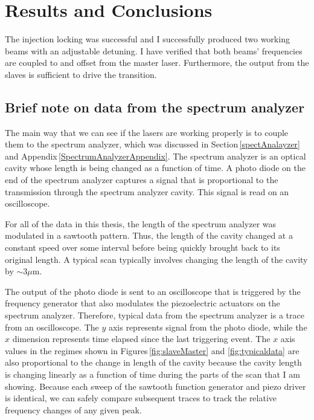 \chapter{Results and Conclusions}\label{triumphantDataChapter}

The injection locking was successful and I successfully produced two working beams with an adjustable detuning. I have verified that both beams' frequencies are coupled to and offset from the master laser. Furthermore, the output from the slaves is sufficient to drive the transition. 

\section{Brief note on data from the spectrum analyzer}

The main way that we can see if the lasers are working properly is to couple them to the spectrum analyzer, which was discussed in Section\,\ref{spectAnalayzer} and Appendix\,\ref{SpectrumAnalyzerAppendix}. The spectrum analyzer is an optical cavity whose length is being changed as a function of time. A photo diode on the end of the spectrum analyzer captures a signal that is proportional to the transmission through the spectrum analyzer cavity. This signal is read on an oscilloscope.

For all of the data in this thesis, the length of the spectrum analyzer was modulated in a sawtooth pattern. Thus, the length of the cavity changed at a constant speed over some interval before being quickly brought back to its original length. A typical scan typically involves changing the length of the cavity by $\sim$3$\mu$m. 


The output of the photo diode is sent to an oscilloscope that is triggered by the frequency generator that also modulates the piezoelectric actuators on the spectrum analyzer. Therefore, typical data from the spectrum analyzer is a trace from an oscilloscope. The $y$ axis represents signal from the photo diode, while the $x$ dimension represents time elapsed since the last triggering event. The $x$ axis values in the regimes shown in Figures\,\ref{fig:slaveMaster} and \ref{fig:typicaldata} are also proportional to the change in length of the cavity because the cavity length is changing linearly as a function of time during the parts of the scan that I am showing. Because each sweep of the sawtooth function generator and piezo driver is identical, we can safely compare subsequent traces to track the relative frequency changes of any given peak. 

